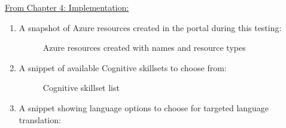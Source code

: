 \underline{From Chapter 4: Implementation:}
\begin{enumerate}
    \item A snapshot of Azure resources created in the portal during this testing:
        \begin {figure}[ht]
            \centering
            \caption{Azure resources created with names and resource types}
            \label{azureresources}
        \end {figure}
    \item A snippet of available Cognitive skillsets to choose from:
        \begin {figure}[h!h]
            \centering
            \caption{Cognitive skillset list}
            \label{cogskillset}
        \end {figure}
    \newpage
    \item A snippet showing language options to choose for targeted language translation:
        \begin {figure}[h!h]
            \centering

\end{figure}
\end{enumerate}
